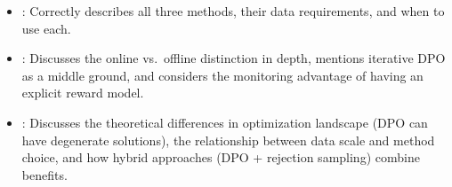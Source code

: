 \begin{interviewq}

\goodgreat
\begin{itemize}
\item {}: Correctly describes all three methods, their data
  requirements, and when to use each.
\item {}: Discusses the online vs.\ offline distinction in
  depth, mentions iterative DPO as a middle ground, and considers the
  monitoring advantage of having an explicit reward model.
\item {}: Discusses the theoretical differences in
  optimization landscape (DPO can have degenerate solutions), the
  relationship between data scale and method choice, and how hybrid
  approaches (DPO + rejection sampling) combine benefits.
\end{itemize}

\end{interviewq}

